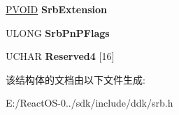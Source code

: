 \begin{DoxyCompactItemize}
\item 
\mbox{\label{struct___s_c_s_i___p_n_p___r_e_q_u_e_s_t___b_l_o_c_k_a2575b18676f520e8ce65a921ee1747e6}} 
\hyperlink{interfacevoid}{P\+V\+O\+ID} {\bfseries Srb\+Extension}
\item 
\mbox{\label{struct___s_c_s_i___p_n_p___r_e_q_u_e_s_t___b_l_o_c_k_a275a4170d01247de4d522c9e9db1eeb9}} 
U\+L\+O\+NG {\bfseries Srb\+Pn\+P\+Flags}
\item 
\mbox{\label{struct___s_c_s_i___p_n_p___r_e_q_u_e_s_t___b_l_o_c_k_afec2ac54383c67de90e5c1bd9942af3f}} 
U\+C\+H\+AR {\bfseries Reserved4} \mbox{[}16\mbox{]}
\end{DoxyCompactItemize}


该结构体的文档由以下文件生成\+:\begin{DoxyCompactItemize}
\item 
E\+:/\+React\+O\+S-\/0../sdk/include/ddk/srb.\+h\end{DoxyCompactItemize}

